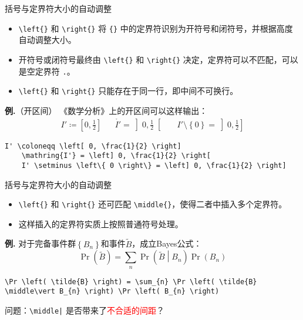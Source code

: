 \documentclass[mathserif]{beamer}
\newcommand{\red}[1]{\textcolor{red}{#1}}
\newcommand{\codegreen}[1]{\textcolor{codegreen}{#1}}
\newenvironment{instance}{\zihao{-5}\textbf{\songti \codegreen{例.}}}{\hfill\par}
\begin{document}
\begin{frame}[fragile]{括号与定界符}{大小的自动调整}
\begin{itemize}

\item \lstinline'\left{}' 和 \lstinline'\right{}' 将 \lstinline'{}' 中的定界符识别为开符号和闭符号，并根据高度自动调整大小。

\item 开符号或闭符号最终由 \lstinline'\left{}' 和 \lstinline'\right{}' 决定，定界符可以不匹配，可以是空定界符 \lstinline'.'。

\item \lstinline'\left{}' 和 \lstinline'\right{}' 只能存在于同一行，即中间不可换行。

\end{itemize}

\begin{instance}（开区间）
	《数学分析》上的开区间可以这样输出：
\begin{equation*}
	\begin{aligned}
	I' \coloneqq \left[ 0, \frac{1}{2} \right] &&
	\mathring{I'} = \left] 0, \frac{1}{2} \right[ &&
	I' \setminus \left\{ 0 \right\} = \left] 0, \frac{1}{2} \right]
	\end{aligned}
\end{equation*}
\begin{lstlisting}[numbers=none]
	I' \coloneqq \left[ 0, \frac{1}{2} \right]
	\mathring{I'} = \left] 0, \frac{1}{2} \right[
	I' \setminus \left\{ 0 \right\} = \left] 0, \frac{1}{2} \right]
\end{lstlisting}
\end{instance}
\end{frame}

\begin{frame}[fragile]{括号与定界符}{大小的自动调整}
\begin{itemize}

\item \lstinline'\left{}' 和 \lstinline'\right{}' 还可匹配 \lstinline'\middle{}'，使得二者中插入多个定界符。

\item 这样插入的定界符实质上按照普通符号处理。

\end{itemize}
\begin{instance}
	对于完备事件群$\left\{ B_{n} \right\}$和事件$\tilde{B}$，成立Bayes公式：
\begin{equation*}
	\Pr \left( \tilde{B} \right) = \sum_{n} \Pr \left( \tilde{B} \middle\vert B_{n} \right) \Pr \left( B_{n} \right)
\end{equation*}
\begin{lstlisting}[numbers=none]
	\Pr \left( \tilde{B} \right) = \sum_{n} \Pr \left( \tilde{B} \middle\vert B_{n} \right) \Pr \left( B_{n} \right)
\end{lstlisting}
\end{instance}
问题：\lstinline'\middle|' 是否带来了\red{不合适的间距}？
\end{frame}
\end{document}
